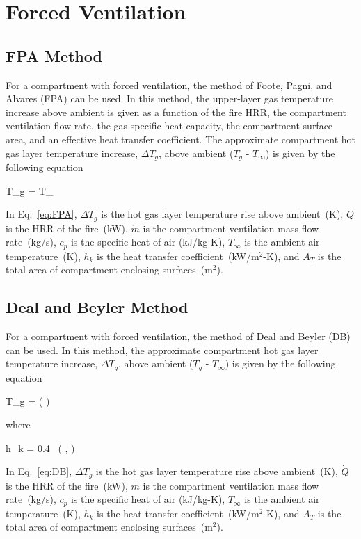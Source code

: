 \clearpage


\section{Forced Ventilation}

\subsection{FPA Method}

For a compartment with forced ventilation, the method of Foote, Pagni, and Alvares (FPA) can be used. In this method, the upper-layer gas temperature increase above ambient is given as a function of the fire HRR, the compartment ventilation flow rate, the gas-specific heat capacity, the compartment surface area, and an effective heat transfer coefficient. The approximate compartment hot gas layer temperature increase, $\Delta T_g$, above ambient ($T_g$ - $T_\infty$) is given by the following equation

\be
\Delta T_g =  T_\infty
\label{eq:FPA}
\ee

In Eq.~\ref{eq:FPA}, $\Delta T_g$ is the hot gas layer temperature rise above ambient~(K), $\dot Q$ is the HRR of the fire~(kW), $\dot m$ is the compartment ventilation mass flow rate~(kg/s), $c_p$ is the specific heat of air (kJ/kg-K), $T_\infty$ is the ambient air temperature~(K), $h_k$ is the heat transfer coefficient~(kW/m$^2$-K), and $A_T$ is the total area of compartment enclosing surfaces~(m$^2$).


\subsection{Deal and Beyler Method}

For a compartment with forced ventilation, the method of Deal and Beyler (DB) can be used. In this method, the approximate compartment hot gas layer temperature increase, $\Delta T_g$, above ambient ($T_g$ - $T_\infty$) is given by the following equation

\be
\Delta T_g = \left(  \right)
\label{eq:DB}
\ee

\noindent where

\be
h_k = 0.4\  \left(  ,  \right)
\label{eq:DB_hk}
\ee

In Eq.~\ref{eq:DB}, $\Delta T_g$ is the hot gas layer temperature rise above ambient~(K), $\dot Q$ is the HRR of the fire~(kW), $\dot m$ is the compartment ventilation mass flow rate~(kg/s), $c_p$ is the specific heat of air (kJ/kg-K), $T_\infty$ is the ambient air temperature~(K), $h_k$ is the heat transfer coefficient~(kW/m$^2$-K), and $A_T$ is the total area of compartment enclosing surfaces~(m$^2$).

